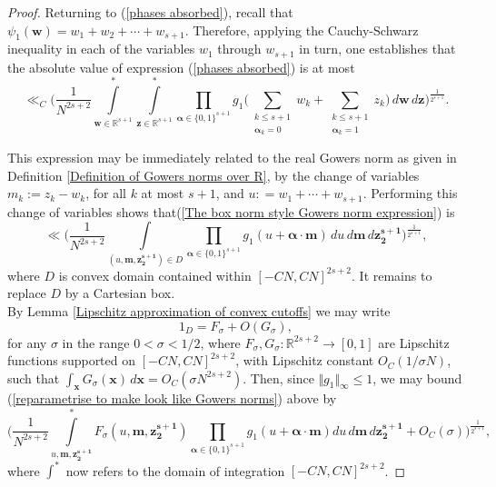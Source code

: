 \documentclass[12pt,a4paper,twoside,reqno]{amsart}
\numberwithin{equation}{section}
\begin{document}
\begin{proof}
Returning to (\ref{phases absorbed}), recall that $\psi_1(\mathbf{w}) = w_1+w_2+\cdots + w_{s+1}$. Therefore, applying the Cauchy-Schwarz inequality in each of the variables $w_1$ through $w_{s+1}$ in turn, one establishes that the absolute value of expression (\ref{phases absorbed}) is at most 
\begin{equation}
\label{The box norm style Gowers norm expression}
\ll_C \Big(\frac{1}{N^{2s+2}}\int\limits_{\mathbf{w} \in\mathbb{R}^{s+1}}^* \int\limits_{\mathbf{z} \in\mathbb{R}^{s+1}}^* \prod\limits_{\boldsymbol{\alpha}\in \{0,1\}^{s+1}}g_1\Big(\sum\limits_{\substack{k\leqslant s+1\\ \boldsymbol{\alpha}_k = 0}}w_k + \sum\limits_{\substack{k\leqslant s+1\\ \boldsymbol{\alpha}_k = 1}}z_k \Big) \, d\mathbf{w}\, d\mathbf{z}\Big)^{\frac{1}{2^{s+1}}}.
\end{equation}


This expression may be immediately related to the real Gowers norm as given in Definition \ref{Definition of Gowers norms over R}, by the change of variables  $m_k:=z_k - w_k$, for all $k$ at most $s+1$, and $u: = w_1+\cdots+w_{s+1}$. Performing this change of variables shows that(\ref{The box norm style Gowers norm expression}) is 
\begin{equation}
\label{reparametrise to make look like Gowers norms}
\ll  \Big(\frac{1}{N^{2s+2}}\int\limits_{(u,\mathbf{m},\mathbf{z_2^{s+1}})\in D}\prod\limits_{\boldsymbol{\alpha}\in \{0,1\}^{s+1}} g_1(u+\boldsymbol{\alpha}\cdot\mathbf{m}) \, du \, d\mathbf{m} \, d \mathbf{z_2^{s+1}} \Big)^{\frac{1}{2^{s+1}}},
\end{equation}
\noindent where $D$ is convex domain contained within $[-CN,CN]^{2s+2}$. It remains to replace $D$ by a Cartesian box.  \\

By Lemma \ref{Lipschitz approximation of convex cutoffs} we may write \[ 1_D = F_{\sigma} + O(G_{\sigma}),\] for any $\sigma$ in the range $0<\sigma<1/2$, where $F_{\sigma},G_{\sigma}:\mathbb{R}^{2s+2} \longrightarrow [0,1]$ are Lipschitz functions supported on $[-CN,CN]^{2s+2}$, with Lipschitz constant $O_C(1/\sigma N)$, such that $\int_{\mathbf{x}} G_\sigma (\mathbf{x}) \, d\mathbf{x} = O_C(\sigma N^{2s+2})$. Then, since $\Vert g_1\Vert_\infty \leqslant 1$, we may bound (\ref{reparametrise to make look like Gowers norms}) above by 
\begin{equation}
\label{final gowers norm tweak}
 \Big(\frac{1}{N^{2s+2}}\int\limits_{u,\mathbf{m},\mathbf{z_2^{s+1}}}^{\ast} F_{\sigma}(u,\mathbf{m},\mathbf{z_2^{s+1}})\prod\limits_{\boldsymbol{\alpha}\in \{0,1\}^{s+1}} g_1(u+\boldsymbol{\alpha}\cdot\mathbf{m})  du \, d\mathbf{m} \, d \mathbf{z_2^{s+1}} + O_C(\sigma)\Big)^{\frac{1}{2^{s+1}}} ,
 \end{equation} where $\int^*$ now refers to the domain of integration $[-CN,CN]^{2s+2}$. 


\end{proof}
\end{document}
